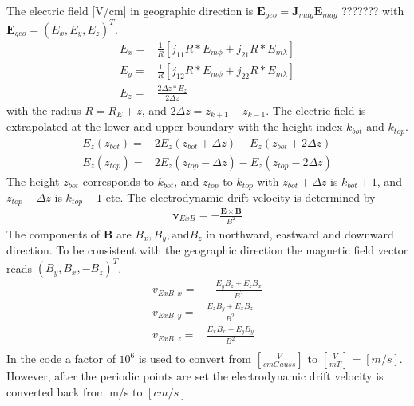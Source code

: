 %
The electric field [V/cm] in geographic direction is
$\mathbf{E}_{geo} = \mathbf{J}_{mag} \mathbf{E}_{mag}$ ??????? with
$\mathbf{E}_{geo} = (E_x,E_y,E_z)^T$.
%
\begin{align}
     E_x  = & \frac{1}{R}\left[ j_{11} R* E_{m \phi} + j_{21} R* E_{m \lambda} \right]\\
     E_y  = & \frac{1}{R}\left[ j_{12} R* E_{m \phi} + j_{22} R* E_{m \lambda} \right]\\
     E_z  = & \frac{2 \Delta z * E_{z}}{2 \Delta z}
\end{align}
%
with the radius $R = R_E + z$, and $2 \Delta z = z_{k+1}-z_{k-1}$.
The electric field is extrapolated at the lower and upper boundary
with the height index $k_{bot}$ and $k_{top}$.
%
\begin{align}
     E_z(z_{bot})    = & 2 E_z(z_{bot}+\Delta z)-E_z(z_{bot}+2 \Delta z) \\
     E_z(z_{top})    = & 2 E_z(z_{top}-\Delta z)-E_z(z_{top}-2 \Delta z)
\end{align}
%
The height $z_{bot}$ corresponds to $k_{bot}$, and $z_{top}$ to
$k_{top}$ with $z_{bot}+ \Delta z $ is $k_{bot}+ 1$, and $z_{top}-
\Delta z $ is $k_{top}- 1$ etc. The electrodynamic drift velocity is
determined by
%
\begin{align}
     \mathbf{v}_{ExB} = - \frac{\mathbf{E}\times \mathbf{B}}{B^2}
\end{align}
%
The components of $\mathbf{B}$ are $B_x, B_y, \text{and} B_z$ in
northward, eastward and downward direction. To be consistent with
the geographic direction the magnetic field vector reads $(B_y, B_x,
- B_z)^T$.
%
\begin{align}
     v_{ExB,x}  = & - \frac{E_y B_z + E_z B_x}{B^2}\\
     v_{ExB,y}  = &   \frac{E_z B_y + E_x B_z}{B^2}\\
     v_{ExB,z}  = &   \frac{E_x B_x - E_y B_y}{B^2}\\
\end{align}
%
In the code a factor of $10^6$ is used to convert from $[\frac{V}{cm
Gauss}]$ to $[\frac{V}{m T}] = [m/s]$. However, after the periodic
points are set the electrodynamic drift velocity is converted back
from m/s to $[cm/s]$
